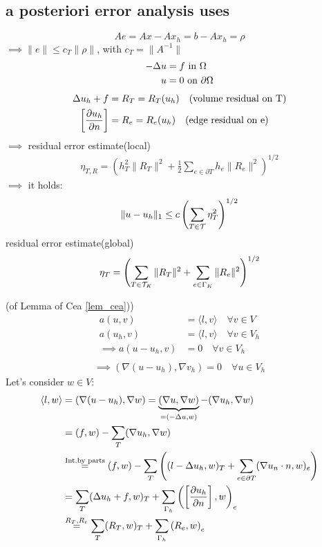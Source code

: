 \subsection{a posteriori error analysis uses}
\begin{equation*}
	Ae = Ax-Ax_h = b - Ax_h = \rho
\end{equation*}
$\implies \|e\| \leq c_T \|\rho\|$, with $c_T = \|A^{-1}\|$
\begin{align*}
	-\Delta u &= f \text{ in } \Omega \\
	u &= 0 \text{ on } \partial \Omega
\end{align*}
\begin{align*}
	\Delta u_h +f &= R_T= R_T(u_h) \quad (\text{volume residual on T}) \\
	\left[\frac{\partial u_h}{\partial n}\right] &= R_e= R_e(u_h) \quad (\text{edge residual on e}) \\
\end{align*}
$\implies$ residual error estimate(local)
\begin{align*}
	\eta_{T,R} = \left( h_T^2 \|R_T\|^2  + \frac{1}{2}\displaystyle \sum_{e\in \partial T}  h_e \|R_e\|^2\right)^{1/2}
\end{align*}
$\implies$ it holds:
\begin{align}\label{lem_cea}
	\|u-u_h\|_1 \leq c \left( \sum \limits_{T \in \mathcal{T}} \eta_T^2 \right)^{1/2}
\end{align}
residual error estimate(global)
\begin{equation*}
	\eta_T = \left(  \sum \limits_{T \in \mathcal{T}_K} \|R_T\|^2  +  \sum \limits_{e \in \Gamma_K} \|R_e\|^2 \right)^{1/2}
\end{equation*}
\begin{proof_}
	(of Lemma of Cea \eqref{lem_cea}))\\
	\begin{align*}
		a(u,v) &= \langle l,v\rangle\quad \forall v\in V \\
		a(u_h,v) &=\langle l,v\rangle \quad \forall v\in V_h \\
		\implies a(u-u_h,v) &=0 \quad \forall v\in V_h \\
	\end{align*}
	\begin{align}
		\implies ( \nabla(u-u_h),\nabla v_h )  =0 \quad \forall u \in V_h 
	\end{align} 
	Let's consider $w \in V$:
	\begin{align*}
		\langle l,w\rangle &= (\nabla(u-u_h),\nabla w) =\underbrace{(\nabla u,\nabla w)}_{=(-\Delta u,w) } - (\nabla u_h,\nabla w) \\
		&= (f,w) - \sum\limits_T (\nabla u_h,\nabla w)\\
		&\stackrel{\text{Int.by parts}}{=} (f,w) - \sum \limits_T \left( (l-\Delta u_h,w)_T + \sum \limits_{e\in\partial T} (\nabla u_n \cdot n,w)_e \right)\\
		&= \sum \limits_T  (\Delta u_h +f,w)_T + \sum \limits_{\Gamma_h} \left(\left[\frac{\partial u_h}{\partial n}\right],w\right)_e \\
		&\stackrel{R_T,R_e}{=} \sum \limits_T  (R_T,w)_T + \sum \limits_{\Gamma_h} \left(R_e,w\right)_e
	\end{align*}
\end{proof_}

